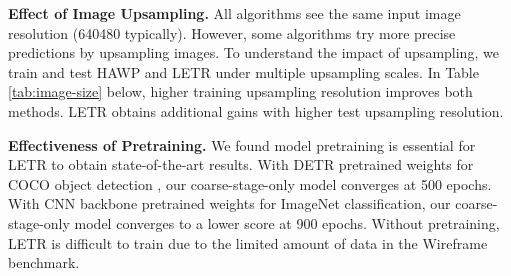 \documentclass[final]{cvpr}
\begin{document}
\noindent\textbf{Effect of Image Upsampling.}
All algorithms see the same input image resolution (640480 typically). However, some algorithms try more precise predictions by upsampling images. To understand the impact of upsampling, we train and test HAWP and LETR under multiple upsampling scales. In Table \ref{tab:image-size} below, higher training upsampling resolution improves both methods. LETR obtains additional gains with higher test upsampling resolution. 

\begin{table}[h]
    \centering
    \vspace{-2mm}
    \caption{\textbf{Effectiveness of upsampling} with Wireframe dataset. LETR uses ResNet-101 backbone. * Our LETR-512 resizes original image with the shortest size in a range between 288 and 512  Our LETR-800 resizes original image with the shortest size in a range between 480 and 800.}
    \label{tab:image-size}
\vspace{-1mm}
\end{table}

\noindent\textbf{Effectiveness of Pretraining.}\label{Pretraining}
We found model pretraining is essential for LETR to obtain state-of-the-art results. With DETR pretrained weights for COCO object detection \cite{lin2014microsoft}, our coarse-stage-only model converges at 500 epochs. With CNN backbone pretrained weights for ImageNet classification, our coarse-stage-only model converges to a lower score at 900 epochs. Without pretraining, LETR is difficult to train due to the limited amount of data in the Wireframe benchmark.   
\end{document}

